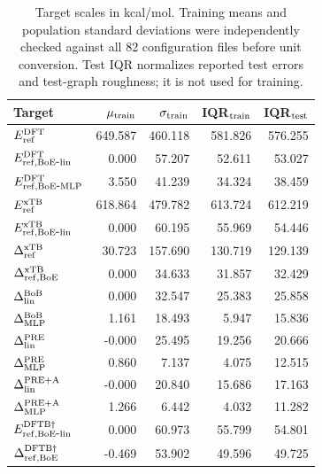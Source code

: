 \begin{table}[H]
\centering
\scriptsize
\setlength{\tabcolsep}{4pt}
\renewcommand{\arraystretch}{1.35}
\caption{Target scales in kcal/mol. Training means and population standard deviations were independently checked against all 82 configuration files before unit conversion. Test IQR normalizes reported test errors and test-graph roughness; it is not used for training.}
\begin{tabular}{lrrrr}
\toprule
Target & $\mu_{\rm train}$ & $\sigma_{\rm train}$ & IQR$_{\rm train}$ & IQR$_{\rm test}$ \\
\midrule
\(E_{\rm ref}^{\rm DFT}\) & 649.587 & 460.118 & 581.826 & 576.255 \\
\(E_{\rm ref,BoE\mbox{-}lin}^{\rm DFT}\) & 0.000 & 57.207 & 52.611 & 53.027 \\
\(E_{\rm ref,BoE\mbox{-}MLP}^{\rm DFT}\) & 3.550 & 41.239 & 34.324 & 38.459 \\
\(E_{\rm ref}^{\rm xTB}\) & 618.864 & 479.782 & 613.724 & 612.219 \\
\(E_{\rm ref,BoE\mbox{-}lin}^{\rm xTB}\) & 0.000 & 60.195 & 55.969 & 54.446 \\
\(\Delta^{\rm xTB}_{\rm ref}\) & 30.723 & 157.690 & 130.719 & 129.139 \\
\(\Delta^{\rm xTB}_{\rm ref,BoE}\) & 0.000 & 34.633 & 31.857 & 32.429 \\
\(\Delta^{\rm BoB}_{\rm lin}\) & 0.000 & 32.547 & 25.383 & 25.858 \\
\(\Delta^{\rm BoB}_{\rm MLP}\) & 1.161 & 18.493 & 5.947 & 15.836 \\
\(\Delta^{\rm PRE}_{\rm lin}\) & -0.000 & 25.495 & 19.256 & 20.666 \\
\(\Delta^{\rm PRE}_{\rm MLP}\) & 0.860 & 7.137 & 4.075 & 12.515 \\
\(\Delta^{\rm PRE+A}_{\rm lin}\) & -0.000 & 20.840 & 15.686 & 17.163 \\
\(\Delta^{\rm PRE+A}_{\rm MLP}\) & 1.266 & 6.442 & 4.032 & 11.282 \\
\(E_{\rm ref,BoE\mbox{-}lin}^{\rm DFTB\dagger}\) & 0.000 & 60.973 & 55.799 & 54.801 \\
\(\Delta^{\rm DFTB\dagger}_{\rm ref,BoE}\) & -0.469 & 53.902 & 49.596 & 49.725 \\
\bottomrule
\end{tabular}
\end{table}

